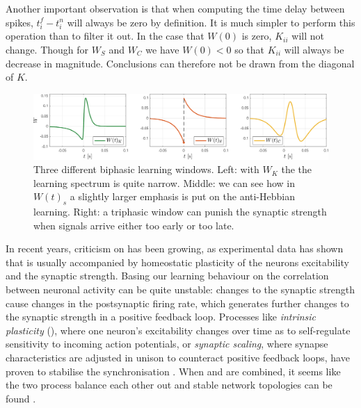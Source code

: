Another important observation is that when computing the time delay between spikes, $t_{i}^{f}-t_i^{n}$ will always be zero by definition. It is much simpler to perform this operation than to filter it out. In the case that $W(0)$ is zero, $K_{ii}$ will not change. Though for $W_S$ and $W_C$ we have $W(0) < 0$ so that $K_{ii}$ will always be decrease in magnitude. Conclusions can therefore not be drawn from the diagonal of $K$.

\begin{figure}[H]
\centering
\includegraphics[width = \textwidth]{../Figures/Learning/LearningWindows.pdf}
\caption{Three different biphasic learning windows. Left: with $W_K$ the the learning spectrum is quite narrow. Middle: we can see how in $W(t)_s$ a slightly larger emphasis is put on the anti-Hebbian learning. Right: a triphasic window can punish the synaptic strength when signals arrive either too early or too late.}
\label{fig:LearningWindows}
\end{figure}

In recent years, criticism on \STDP has been growing, as experimental data has shown that \STDP is usually accompanied by homeostatic plasticity of the neurons excitability and the synaptic strength. Basing our learning behaviour on the correlation between neuronal activity can be quite unstable: changes to the synaptic strength cause changes in the postsynaptic firing rate, which generates further changes to the synaptic strength in a positive feedback loop. Processes like \textsl{intrinsic plasticity} (\IP), where one neuron's excitability changes over time as to self-regulate sensitivity to incoming action potentials, or \textsl{synaptic scaling}, where synapse characteristics are adjusted in unison to counteract positive feedback loops, have proven to stabilise the synchronisation \cite{ChrolCannon2014, Kirkwood2019}. When \STDP and \IP are combined, it seems like the two process balance each other out and stable network topologies can be found \cite{Song2017}.


